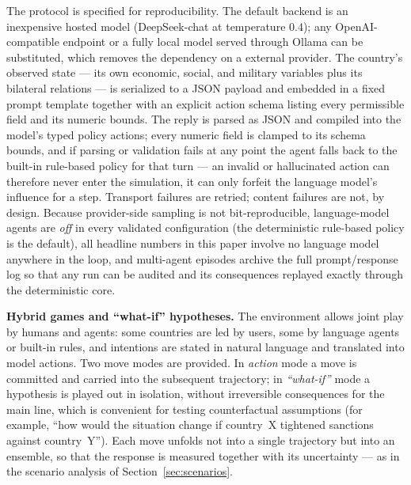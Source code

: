 \documentclass[a4paper,fleqn]{cas-sc}
\begin{document}
The protocol is specified for reproducibility. The default backend is an inexpensive hosted model
(DeepSeek-chat at temperature $0.4$); any OpenAI-compatible endpoint or a fully local model served
through Ollama can be substituted, which removes the dependency on a external provider. The
country's observed state --- its own economic, social, and military variables plus its bilateral
relations --- is serialized to a JSON payload and embedded in a fixed prompt template together
with an explicit action schema listing every permissible field and its numeric bounds. The reply
is parsed as JSON and compiled into the model's typed policy actions; every numeric field is
clamped to its schema bounds, and if parsing or validation fails at any point the agent falls back
to the built-in rule-based policy for that turn --- an invalid or hallucinated action can
therefore never enter the simulation, it can only forfeit the language model's influence for a
step. Transport failures are retried; content failures are not, by design. Because provider-side
sampling is not bit-reproducible, language-model agents are \emph{off} in every validated
configuration (the deterministic rule-based policy is the default), all headline numbers in this
paper involve no language model anywhere in the loop, and multi-agent episodes archive the full
prompt/response log so that any run can be audited and its consequences replayed exactly through
the deterministic core.

\textbf{Hybrid games and ``what-if'' hypotheses.} The environment allows joint play by humans and
agents: some countries are led by users, some by language agents or built-in rules, and intentions
are stated in natural language and translated into model actions. Two move modes are provided. In
\emph{action} mode a move is committed and carried into the subsequent trajectory; in
\emph{``what-if''} mode a hypothesis is played out in isolation, without irreversible consequences
for the main line, which is convenient for testing counterfactual assumptions (for example, ``how
would the situation change if country~X tightened sanctions against country~Y''). Each move unfolds
not into a single trajectory but into an ensemble, so that the response is measured together with
its uncertainty --- as in the scenario analysis of Section~\ref{sec:scenarios}.
\end{document}
